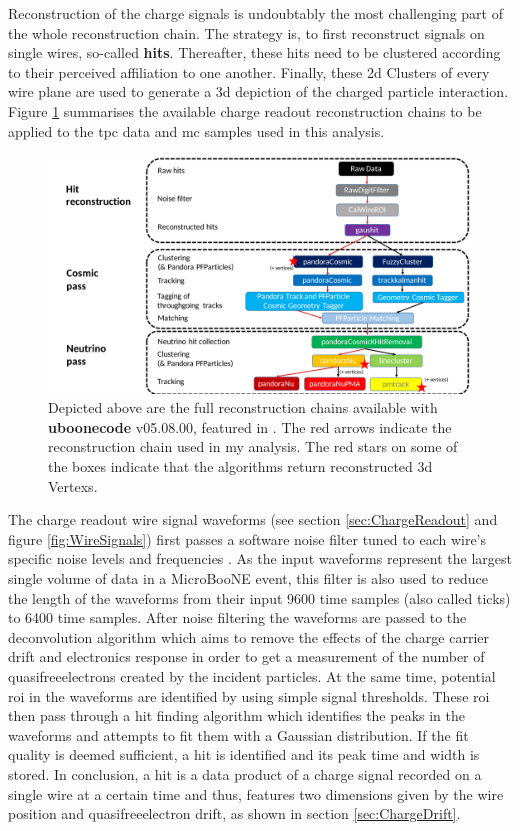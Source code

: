 Reconstruction of the charge signals is undoubtably the most challenging part of the whole reconstruction chain. The strategy is, to first reconstruct signals on single wires, so-called \textbf{hits}. Thereafter, these hits need to be clustered according to their perceived affiliation to one another. Finally, these \gls{2d} \glspl{Cluster} of every wire plane are used to generate a \gls{3d} depiction of the charged particle interaction. Figure \ref{fig:RecoChain} summarises the available charge readout reconstruction chains to be applied to the \gls{tpc} data and \gls{mc} samples used in this analysis.
\begin{figure}[htbp]
    \centering
    \includegraphics[width=1.0\textwidth]{images/FirstCCInclusive/RecoChart.pdf}
    \caption[Reconstruction Chain of \textbf{uboonecode} v05.08.00]{Depicted above are the full reconstruction chains available with \textbf{uboonecode} v05.08.00, featured in \cite{MicroBooNECCInclPN}. The red arrows indicate the reconstruction chain used in my analysis. The red stars on some of the boxes indicate that the algorithms return reconstructed \gls{3d} \glspl{Vertex}.}
    \label{fig:RecoChain}
\end{figure}

The charge readout wire signal waveforms (see section \ref{sec:ChargeReadout} and figure \ref{fig:WireSignals}) first passes a software noise filter tuned to each wire's specific noise levels and frequencies \cite{MicroBooNENoiseFilterPN}. As the input waveforms represent the largest single volume of data in a MicroBooNE event, this filter is also used to reduce the length of the waveforms from their input \num{9600} time samples (also called ticks) to \num{6400} time samples. After noise filtering the waveforms are passed to the deconvolution algorithm which aims to remove the effects of the charge carrier drift and electronics response in order to get a measurement of the number of \glspl{quasifreeelectron} created by the incident particles. At the same time, potential \gls{roi} in the waveforms are identified by using simple signal thresholds. These \gls{roi} then pass through a hit finding algorithm which identifies the peaks in the waveforms and attempts to fit them with a Gaussian distribution. If the fit quality is deemed sufficient, a hit is identified and its peak time and width is stored. In conclusion, a hit is a data product of a charge signal recorded on a single wire at a certain time and thus, features two dimensions given by the wire position and \gls{quasifreeelectron} drift, as shown in section \ref{sec:ChargeDrift}. 

